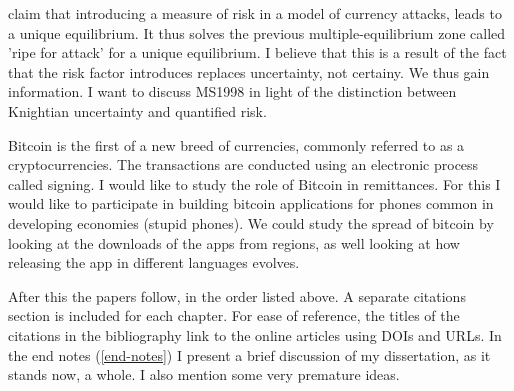 \documentclass[a4paper]{report}\usepackage{graphicx, color}
\begin{document}
\begin{refsection}
\textcite{morris1998unique} claim that introducing a measure of risk in a model of currency attacks, leads to a unique equilibrium. It thus solves the previous multiple-equilibrium zone called 'ripe for attack' for a unique equilibrium. I believe that this is a result of the fact that the risk factor introduces replaces uncertainty, not certainy. We thus gain information. I want to discuss MS1998 in light of the distinction between Knightian uncertainty and quantified risk.

Bitcoin is the first of a new breed of currencies, commonly referred to as a cryptocurrencies. The transactions are conducted using an electronic process called signing. I would like to study the role of Bitcoin in remittances. For this I would like to participate in building bitcoin applications for phones common in developing economies (stupid phones). We could study the spread of bitcoin by looking at the downloads of the apps from regions, as well looking at how releasing the app in different languages evolves.

After this the papers follow, in the order listed above. A separate citations section is included for each chapter. For ease of reference, the titles of the citations in the bibliography link to the online articles using DOIs and URLs. In the end notes (\ref{end-notes}) I present a brief discussion of my dissertation, as it stands now, a whole. I also mention some very premature ideas.

\printbibliography
\end{refsection}
\end{document}
